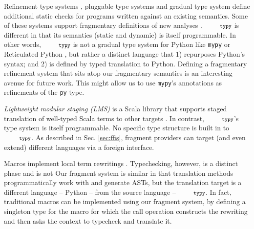 \documentclass[10pt]{sigplanconf}
\newcommand{\typy}{\texttt{\footnotesize typy}}
\newcommand{\lip}[1]{\lstinline[language=Python,basicstyle=\ttfamily\footnotesize,morekeywords={with},deletendkeywords={tuple,buffer,map}]{#1}}
\newcommand{\li}[1]{\lip{#1}}
\begin{document}
Refinement type systems \cite{Freeman91}, pluggable type systems \cite{Brac04a,Andreae:2006:FIP:1167473.1167479,brown2016build,DBLP:journals/toplas/MarkstrumMEMAN10} and gradual type system \cite{Siek06a,siek2007gradual} define additional static checks for programs written against an existing semantics. Some of these systems support fragmentary definitions of new analyses \cite{DBLP:journals/toplas/MarkstrumMEMAN10,brown2016build}. $\typy$ is different in that its semantics (static and dynamic) is itself programmable. In other words, $\typy$ is not a gradual type system for Python like \texttt{mypy} \cite{mypy} or Reticulated Python \cite{DBLP:conf/dls/VitousekKSB14}, but rather a distinct language that 1) repurposes Python's syntax; and 2) is defined by typed translation to Python. %
Defining a fragmentary refinement system that sits atop our fragmentary semantics is an interesting avenue for future work. This might allow us to use \texttt{mypy}'s annotations as refinements of the \li{py} type.  %

\emph{Lightweight modular staging (LMS)} is a Scala library that supports staged translation of well-typed Scala terms to other targets \cite{Rompf:2012:LMS}. In contrast, $\typy$'s type system is itself  programmable. No specific type structure is built in to $\typy$. As described in Sec. \ref{sec:ffis}, fragment providers can target (and even extend) different languages via a foreign interface. %

Macros implement local term rewritings \cite{Hart63a,ScalaMacros2013}. Typechecking, however, is a distinct phase and is not Our fragment system is similar in that translation methods  programmatically work with and generate ASTs, but the translation target is a different language -- Python -- from the source language -- $\typy$. In fact, traditional macros can be implemented using our fragment system, by defining a singleton type for the macro for which the call operation constructs the rewriting and then asks the context to typecheck and translate it.
\end{document}
